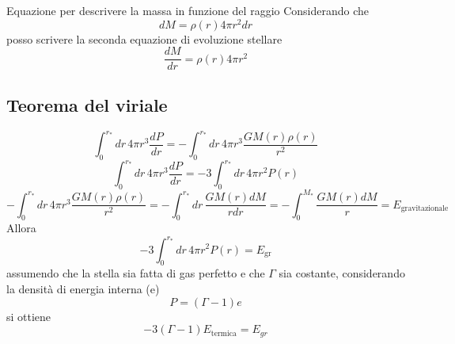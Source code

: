 Equazione per descrivere la massa in funzione del raggio \newline
Considerando che 
\begin{equation*}
    dM = \rho(r) 4 \pi r^2 dr
\end{equation*}
posso scrivere la seconda equazione di evoluzione stellare
\begin{equation}
    \frac{dM}{dr} = \rho(r) 4 \pi r^2
\end{equation}

\subsection{Teorema del viriale}
\begin{equation*}
    \int_0^{r_*} dr \, 4 \pi r^3 \frac{dP}{dr} = -\int_0^{r_*} dr \, 4 \pi r^3 \frac{GM(r)\rho(r)}{r^2}
\end{equation*}
\begin{equation*}
    \int_0^{r_*} dr \, 4 \pi r^3 \frac{dP}{dr} = - 3 \int_0^{r_*} dr \, 4 \pi r^2 P(r)
\end{equation*}
\begin{equation*}
    -\int_0^{r_*} dr \, 4 \pi r^3 \frac{GM(r)\rho(r)}{r^2} = -\int_0^{r_*} dr \, \frac{GM(r)dM}{rdr} = -\int_0^{M_*} \frac{GM(r)dM}{r} = E_{\mbox{gravitazionale}} 
\end{equation*}
Allora 
\begin{equation*}
    - 3 \int_0^{r_*} dr \, 4 \pi r^2 P(r) = E_{\mbox{gr}}
\end{equation*}
assumendo che la stella sia fatta di gas perfetto e che $\Gamma$ sia costante, considerando la densità di energia interna (e)
\begin{equation*}
    P = (\Gamma - 1)e
\end{equation*}
si ottiene 
\begin{equation*}
    -3 (\Gamma - 1) E_{\mbox{termica}} = E_{gr}
\end{equation*}
